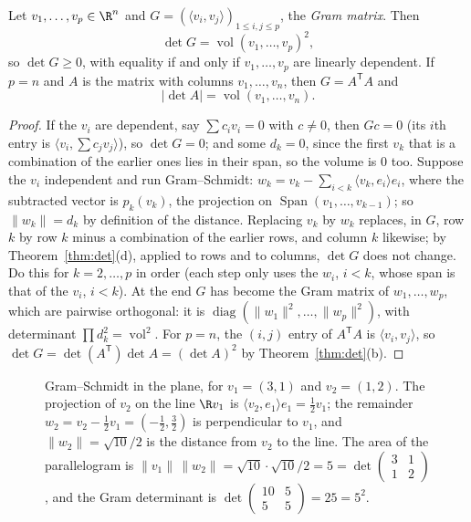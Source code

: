 \begin{theorem}\label{thm:gram}
Let $v_1,\dots,v_p\in\R^n$ and $G=\left(\langle v_i,v_j\rangle\right)_{1\le i,j\le p}$, the \emph{Gram matrix}. Then
\[
\det G=\operatorname{vol}(v_1,\dots,v_p)^2 ,
\]
so $\det G\ge0$, with equality if and only if $v_1,\dots,v_p$ are linearly dependent. If $p=n$ and $A$ is the matrix with columns $v_1,\dots,v_n$, then $G=A^{\mathsf T}A$ and
\[
|\det A|=\operatorname{vol}(v_1,\dots,v_n).
\]
\end{theorem}
\begin{proof}
If the $v_i$ are dependent, say $\sum c_iv_i=0$ with $c\ne0$, then $Gc=0$ (its $i$th entry is $\langle v_i,\sum c_jv_j\rangle$), so $\det G=0$; and some $d_k=0$, since the first $v_k$ that is a combination of the earlier ones lies in their span, so the volume is $0$ too. Suppose the $v_i$ independent and run Gram--Schmidt: $w_k=v_k-\sum_{i<k}\langle v_k,e_i\rangle e_i$, where the subtracted vector is $p_k(v_k)$, the projection on $\operatorname{Span}(v_1,\dots,v_{k-1})$; so $\|w_k\|=d_k$ by definition of the distance. Replacing $v_k$ by $w_k$ replaces, in $G$, row $k$ by row $k$ minus a combination of the earlier rows, and column $k$ likewise; by Theorem~\ref{thm:det}(d), applied to rows and to columns, $\det G$ does not change. Do this for $k=2,\dots,p$ in order (each step only uses the $w_i$, $i<k$, whose span is that of the $v_i$, $i<k$). At the end $G$ has become the Gram matrix of $w_1,\dots,w_p$, which are pairwise orthogonal: it is $\operatorname{diag}(\|w_1\|^2,\dots,\|w_p\|^2)$, with determinant $\prod d_k^2=\operatorname{vol}^2$. For $p=n$, the $(i,j)$ entry of $A^{\mathsf T}A$ is $\langle v_i,v_j\rangle$, so $\det G=\det(A^{\mathsf T})\det A=(\det A)^2$ by Theorem~\ref{thm:det}(b).
\end{proof}

\begin{figure}[ht]
\centering
{}
\caption{Gram--Schmidt in the plane, for $v_1=(3,1)$ and $v_2=(1,2)$. The projection of $v_2$ on the line $\R v_1$ is $\langle v_2,e_1\rangle e_1=\frac12v_1$; the remainder $w_2=v_2-\frac12v_1=(-\frac12,\frac32)$ is perpendicular to $v_1$, and $\|w_2\|=\sqrt{10}/2$ is the distance from $v_2$ to the line. The area of the parallelogram is $\|v_1\|\,\|w_2\|=\sqrt{10}\cdot\sqrt{10}/2=5=\det\begin{pmatrix}3&1\\1&2\end{pmatrix}$, and the Gram determinant is $\det\begin{pmatrix}10&5\\5&5\end{pmatrix}=25=5^2$.}
\label{fig:gramschmidt}
\end{figure}

